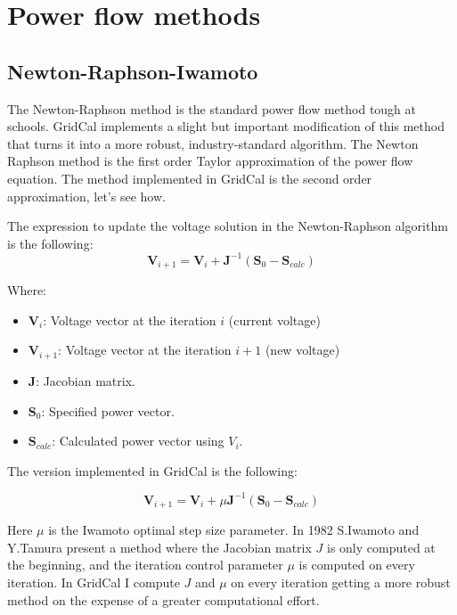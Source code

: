 \documentclass[11pt,fleqn]{book} %
\begin{document}
\chapter{Power flow methods}

\section{Newton-Raphson-Iwamoto}

The Newton-Raphson method is the standard power flow method tough at schools. GridCal implements a slight but important modification of this method that turns it into a more robust, industry-standard algorithm. The Newton Raphson method is the first order Taylor approximation of the power flow equation. The method implemented in GridCal is the second order approximation, let's see how.

The expression to update the voltage solution in the Newton-Raphson algorithm is the following:
\begin{equation}
\textbf{V}_{i+1} = \textbf{V}_i + \textbf{J}^{-1}(\textbf{S}_0 - \textbf{S}_{calc})
\end{equation}

Where:
\begin{itemize}
	\item $\textbf{V}_i$: Voltage vector at the iteration $i$  (current voltage) 
	\item $\textbf{V}_{i+1}$: Voltage vector at the iteration $i+1$  (new voltage)
	\item $\textbf{J}$: Jacobian matrix.
	\item $\textbf{S}_0$: Specified power vector.
	\item $\textbf{S}_{calc}$: Calculated power vector using $V_i$.
\end{itemize}

The version implemented in GridCal is the following:

\begin{equation}
\textbf{V}_{i+1} = \textbf{V}_i + \mu \textbf{J}^{-1}(\textbf{S}_0 - \textbf{S}_{calc})
\end{equation}

Here $\mu$ is the Iwamoto optimal step size parameter. In 1982 S.Iwamoto and Y.Tamura present a method \cite{iwamoto1981load} where the Jacobian matrix $J$ is only computed at the beginning, and the iteration control parameter $\mu$ is computed on every iteration. In GridCal I compute $J$ and $\mu$ on every iteration getting a more robust method on the expense of a greater computational effort.
\end{document}
